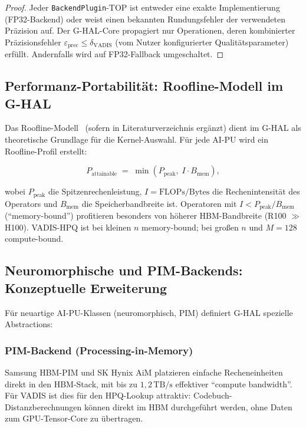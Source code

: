 ﻿\documentclass[12pt,a4paper]{article}
\begin{document}
\begin{proof}
Jeder \texttt{BackendPlugin}-TOP ist entweder eine exakte
Implementierung (FP32-Backend) oder weist einen bekannten
Rundungsfehler der verwendeten Präzision auf.
Der G-HAL-Core propagiert nur Operationen, deren kombinierter
Präzisionsfehler $\varepsilon_{\text{prec}} \leq \delta_{\text{VADIS}}$
(vom Nutzer konfigurierter Qualitätsparameter) erfüllt.
Andernfalls wird auf FP32-Fallback umgeschaltet.
\end{proof}

\subsection{Performanz-Portabilität: Roofline-Modell im G-HAL}
\label{sub:roofline}

Das Roofline-Modell~\cite{williams2009roofline} (sofern in
Literaturverzeichnis ergänzt) dient im G-HAL als theoretische
Grundlage für die Kernel-Auswahl. Für jede AI-PU wird ein
Roofline-Profil erstellt:

\begin{equation}
  P_{\text{attainable}} \;=\; \min\!\left(
    P_{\text{peak}},\;
    I \cdot B_{\text{mem}}
  \right),
\end{equation}

wobei $P_{\text{peak}}$ die Spitzenrechenleistung,
$I = \text{FLOPs}/\text{Bytes}$ die Rechenintensität
des Operators und $B_{\text{mem}}$ die Speicherbandbreite ist.
Operatoren mit $I < P_{\text{peak}} / B_{\text{mem}}$
(``memory-bound'') profitieren besonders von höherer HBM-Bandbreite
(R100 $\gg$ H100). VADIS-HPQ ist bei kleinen $n$ memory-bound;
bei großen $n$ und $M=128$ compute-bound.

\subsection{Neuromorphische und PIM-Backends: Konzeptuelle Erweiterung}
\label{sub:neuro_pim}

Für neuartige AI-PU-Klassen (neuromorphisch, PIM) definiert
G-HAL spezielle Abstractions:

\subsubsection{PIM-Backend (Processing-in-Memory)}

Samsung HBM-PIM und SK Hynix AiM platzieren einfache
Recheneinheiten direkt in den HBM-Stack, mit bis zu
$1,2\,\text{TB/s}$ effektiver ``compute bandwidth''.
Für VADIS ist dies für den HPQ-Lookup attraktiv:
Codebuch-Distanzberechnungen können direkt im HBM
durchgeführt werden, ohne Daten zum GPU-Tensor-Core zu übertragen.
\end{document}
